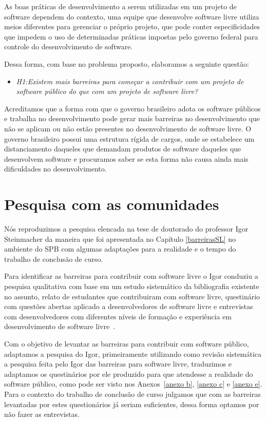 As boas práticas de desenvolvimento a serem utilizadas em um projeto de software 
dependem do contexto, uma equipe que desenvolve software livre utiliza
meios diferentes para gerenciar o próprio projeto, que pode conter especificidades 
que impedem o uso de determinadas práticas impostas pelo governo federal para controle
do desenvolvimento de software. 

Dessa forma, com base no problema proposto, elaboramos a seguinte questão:

\begin{itemize}
\item \emph{H1:Existem mais barreiras para começar a contribuir 
com um projeto de software público do que com um projeto de software livre?}

\end{itemize}

Acreditamos que a forma com que o governo brasileiro adota os software públicos
e trabalha no desenvolvimento pode gerar mais barreiras no desenvolvimento que 
não se aplicam ou não estão presentes no desenvolvimento de software livre. O
governo brasileiro possui uma estrutura rígida de cargos, onde se estabelece um
distanciamento daqueles que demandam produtos de software daqueles que desenvolvem
software e procuramos saber se esta forma não causa ainda mais dificuldades no 
desenvolvimento.

\section{Pesquisa com as comunidades}

Nós reproduzimos a pesquisa elencada na tese de doutorado do professor Igor 
Steinmacher da maneira que foi apresentada no Capítulo \ref{barreirasSL} no ambiente
do SPB com algumas adaptações para a realidade e o tempo do trabalho de conclusão
de curso.

Para identificar as barreiras para contribuir com software livre o Igor conduziu a 
pesquisa qualitativa com base em um estudo sistemático da bibliografia existente no
assunto, relato de estudantes que contribuiram com software livre, questinário com 
questões abertas aplicado a desenvolvedores de software livre e entrevistas com 
desenvolvedores com diferentes níveis de formação e experiência em desenvolvimento
de software livre~\cite{steinmancher2015}.
 
Com o objetivo de levantar as barreiras para contribuir com software público, adaptamos
a pesquisa do Igor, primeiramente utilizando como revisão sistemática a pesquisa feita 
pelo Igor das barreiras para software livre, traduzimos e adaptamos os questinários
por ele produzido para que atendesse a realidade do software público, como pode ser 
visto nos Anexos~\ref{anexo b}, \ref{anexo c} e \ref{anexo e}. Para o contexto do 
trabalho de conclusão de curso julgamos que com as barreiras levantadas por estes 
questionários já seriam suficientes, dessa forma optamos por não fazer as entrevistas.

